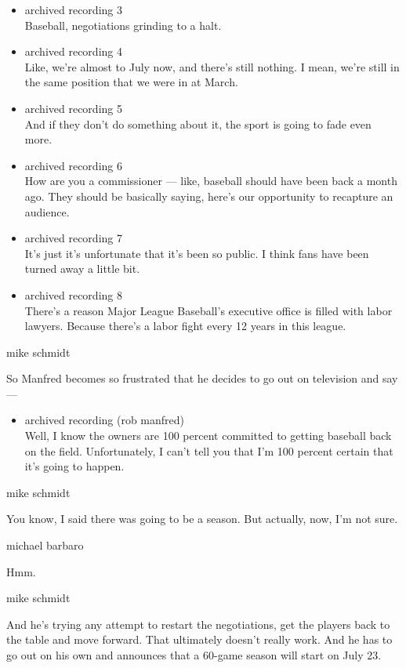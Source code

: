 \begin{itemize}
\item
  archived recording 3\\
  Baseball, negotiations grinding to a halt.
\item
  archived recording 4\\
  Like, we're almost to July now, and there's still nothing. I mean,
  we're still in the same position that we were in at March.
\item
  archived recording 5\\
  And if they don't do something about it, the sport is going to fade
  even more.
\item
  archived recording 6\\
  How are you a commissioner --- like, baseball should have been back a
  month ago. They should be basically saying, here's our opportunity to
  recapture an audience.
\item
  archived recording 7\\
  It's just it's unfortunate that it's been so public. I think fans have
  been turned away a little bit.
\item
  archived recording 8\\
  There's a reason Major League Baseball's executive office is filled
  with labor lawyers. Because there's a labor fight every 12 years in
  this league.
\end{itemize}

mike schmidt

So Manfred becomes so frustrated that he decides to go out on television
and say ---

\begin{itemize}
\tightlist
\item
  archived recording (rob manfred)\\
  Well, I know the owners are 100 percent committed to getting baseball
  back on the field. Unfortunately, I can't tell you that I'm 100
  percent certain that it's going to happen.
\end{itemize}

mike schmidt

You know, I said there was going to be a season. But actually, now, I'm
not sure.

michael barbaro

Hmm.

mike schmidt

And he's trying any attempt to restart the negotiations, get the players
back to the table and move forward. That ultimately doesn't really work.
And he has to go out on his own and announces that a 60-game season will
start on July 23.

